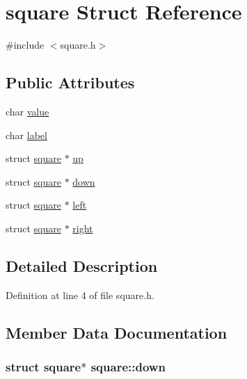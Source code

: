 \hypertarget{structsquare}{\section{square Struct Reference}
\label{structsquare}
}


{\ttfamily \#include $<$square.\-h$>$}

\subsection*{Public Attributes}
\begin{DoxyCompactItemize}
\item 
char \hyperlink{structsquare_a58f1a8b7f7f19866c82fd70e497895f6}{value}
\item 
char \hyperlink{structsquare_a07e1733aa998224f5efb29084efc68c9}{label}
\item 
struct \hyperlink{structsquare}{square} $\ast$ \hyperlink{structsquare_a7b17203c38eb644726b2cee9582c3360}{up}
\item 
struct \hyperlink{structsquare}{square} $\ast$ \hyperlink{structsquare_a78bc4af827089778314c2a3c34af5f75}{down}
\item 
struct \hyperlink{structsquare}{square} $\ast$ \hyperlink{structsquare_ac2109f761e5d281cbd9555b31337ff42}{left}
\item 
struct \hyperlink{structsquare}{square} $\ast$ \hyperlink{structsquare_abc1f49545672858dc057027d5e09b74e}{right}
\end{DoxyCompactItemize}


\subsection{Detailed Description}


Definition at line 4 of file square.\-h.



\subsection{Member Data Documentation}
\hypertarget{structsquare_a78bc4af827089778314c2a3c34af5f75}{
\subsubsection[{down}]{\setlength{\rightskip}{0pt plus 5cm}struct {\bf square}$\ast$ square\-::down}}\label{structsquare_a78bc4af827089778314c2a3c34af5f75}



